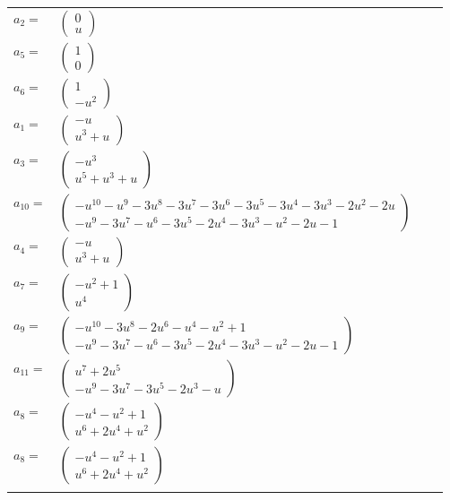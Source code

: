 \documentclass[1p]{elsarticle_modified}
\theoremstyle{definition}
\begin{document}
\begin{tabular}{m{7pt} m{180pt} m{7pt} m{180pt} }
\flushright $a_{2}=$&$\begin{pmatrix}0\\u\end{pmatrix}$ \\
\flushright $a_{5}=$&$\begin{pmatrix}1\\0\end{pmatrix}$ \\
\flushright $a_{6}=$&$\begin{pmatrix}1\\- u^2\end{pmatrix}$ \\
\flushright $a_{1}=$&$\begin{pmatrix}- u\\u^3+u\end{pmatrix}$ \\
\flushright $a_{3}=$&$\begin{pmatrix}- u^3\\u^5+u^3+u\end{pmatrix}$ \\
\flushright $a_{10}=$&$\begin{pmatrix}- u^{10}- u^9-3 u^8-3 u^7-3 u^6-3 u^5-3 u^4-3 u^3-2 u^2-2 u\\- u^9-3 u^7- u^6-3 u^5-2 u^4-3 u^3- u^2-2 u-1\end{pmatrix}$ \\
\flushright $a_{4}=$&$\begin{pmatrix}- u\\u^3+u\end{pmatrix}$ \\
\flushright $a_{7}=$&$\begin{pmatrix}- u^2+1\\u^4\end{pmatrix}$ \\
\flushright $a_{9}=$&$\begin{pmatrix}- u^{10}-3 u^8-2 u^6- u^4- u^2+1\\- u^9-3 u^7- u^6-3 u^5-2 u^4-3 u^3- u^2-2 u-1\end{pmatrix}$ \\
\flushright $a_{11}=$&$\begin{pmatrix}u^7+2 u^5\\- u^9-3 u^7-3 u^5-2 u^3- u\end{pmatrix}$ \\
\flushright $a_{8}=$&$\begin{pmatrix}- u^4- u^2+1\\u^6+2 u^4+u^2\end{pmatrix}$\\ \flushright $a_{8}=$&$\begin{pmatrix}- u^4- u^2+1\\u^6+2 u^4+u^2\end{pmatrix}$\\&\end{tabular}
\end{document}
